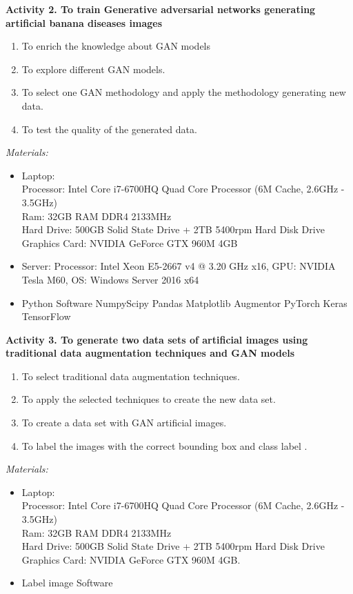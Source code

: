 \textbf{Activity 2. To train Generative adversarial networks generating artificial banana diseases images}

\begin{enumerate}
    \item To enrich the knowledge about GAN models
    \item To explore different GAN models.
    \item To select one GAN methodology and apply the methodology generating new data.    
    \item To test the quality of the generated data.
\end{enumerate}

\emph{Materials:}
\begin{itemize}
    \item Laptop:\\Processor: Intel Core i7-6700HQ Quad Core Processor (6M Cache, 2.6GHz - 3.5GHz)\\Ram: 32GB RAM DDR4 2133MHz \\ Hard Drive: 500GB Solid State Drive + 2TB 5400rpm Hard Disk Drive \\ Graphics Card: NVIDIA GeForce GTX 960M 4GB
    \item  Server: Processor: Intel Xeon E5-2667 v4 @ 3.20 GHz  x16, GPU: NVIDIA Tesla M60, OS: Windows Server 2016 x64 
    \item Python Software
    \subitem Numpy\subitem Scipy \subitem Pandas \subitem Matplotlib  \subitem Augmentor \subitem PyTorch \subitem Keras \subitem TensorFlow
\end{itemize}


\textbf{Activity 3. To generate two data sets of artificial images using traditional data augmentation techniques and GAN models}

\begin{enumerate}
	\item To select traditional data augmentation techniques.
	\item To apply the selected techniques to create the new data set.
	\item To create a data set with GAN artificial images.
	\item To label the images with the correct bounding box and class label .
\end{enumerate}
\emph{Materials:}
    \begin{itemize}
    \item Laptop:\\Processor: Intel Core i7-6700HQ Quad Core Processor (6M Cache, 2.6GHz - 3.5GHz)\\Ram: 32GB RAM DDR4 2133MHz \\ Hard Drive: 500GB Solid State Drive + 2TB 5400rpm Hard Disk Drive \\ Graphics Card: NVIDIA GeForce GTX 960M 4GB.
    \item Label image Software
\end{itemize}

